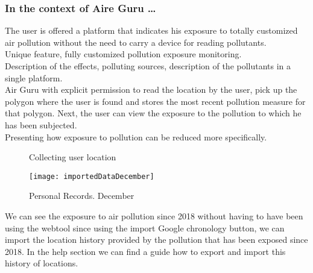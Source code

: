 \subsubsection*{In the context of Aire Guru \ldots} 

The user is offered a platform that indicates his exposure to totally customized air pollution without the need to carry a device for reading pollutants.\\

Unique feature, fully customized pollution exposure monitoring. \\

Description of the effects, polluting sources, description of the pollutants in a single platform. \\

Air Guru with explicit permission to read the location by the user, pick up the polygon where
the user is found and stores the most recent pollution measure for that polygon.
Next, the user can view the exposure to the pollution to which he has been subjected.\\

Presenting how exposure to pollution can be reduced more specifically.\\

\begin{figure}[ht]
    \centering 
    \caption{Collecting user location}
\end{figure}

\begin{figure}[ht]
    \centering
    \texttt{[image: importedDataDecember]}
    \caption{Personal Records. December}
\end{figure}

We can see the exposure to air pollution since 2018 without having to have been using the webtool since
using the import Google chronology button, we can import the location history provided by the pollution that has been exposed since 2018.
In the help section we can find a guide how to export and import this history of locations.